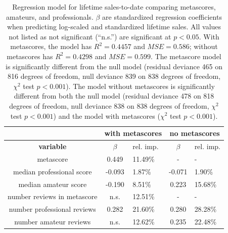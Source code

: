 \documentclass[letterpaper]{article}
\begin{document}
\begin{table}[tb]
\begin{tabularx}{\linewidth}{|c|c|X|c|X|}
\hline  & \multicolumn{2}{|c|}{\textbf{with metascores}} & \multicolumn{2}{|c|}{\textbf{no metascores}}\\ 
\hline \textbf{variable} & \textbf{$\beta$} & rel. imp. & \textbf{$\beta$} & rel. imp.\\ 
\hline metascore & 0.449 & 11.49\% & - & - \\ 
\hline median professional score & -0.093 & 1.87\% & -0.071 & 1.90\% \\ 
\hline median amateur score & -0.190 & 8.51\% & 0.223 & 15.68\% \\ 
\hline number reviews in metascore & n.s. & 12.51\% & - & - \\ 
\hline number professional reviews & 0.282 & 21.60\% & 0.280 & 28.28\% \\ 
\hline number amateur reviews & n.s. & 12.62\% & 0.235 & 22.48\% \\ 
\hline 
\end{tabularx}
\caption{Regression model for lifetime sales-to-date comparing metascores, amateurs, and professionals. $\beta$ are standardized regression coefficients when predicting log-scaled and standardized lifetime sales. All values not listed as not significant (``n.s.'') are significant at $p < 0.05$. 
With metascores, the model has $R^2 = 0.4457$ and $MSE = 0.586$; without metascores has $R^2 = 0.4298$ and $MSE = 0.599$. 
The metascore model is significantly different from the null model (residual deviance 465 on 816 degrees of freedom, null deviance 839 on 838 degrees of freedom, $\chi^2$ test $p < 0.001$). The model without metascores is significantly different from both the null model (residual deviance 478 on 818 degrees of freedom, null deviance 838 on 838 degrees of freedom, $\chi^2$ test $p < 0.001$) and the model with metascores ($\chi^2$ test $p < 0.001$).
}
\label{tab:sales_metascore_lm}
\end{table}
\end{document}
